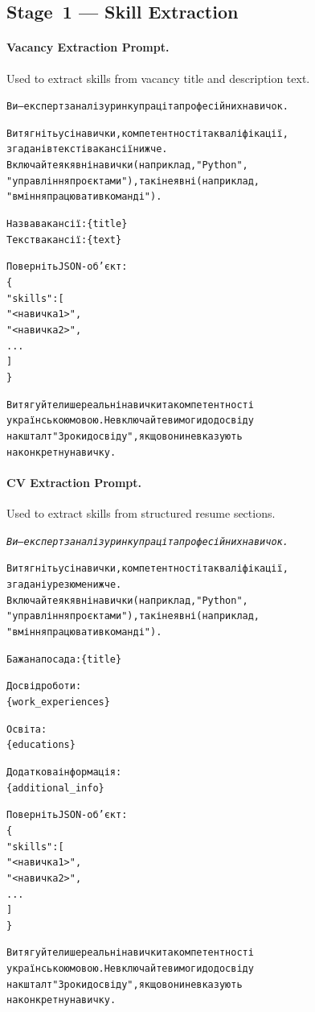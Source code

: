 \documentclass[11pt]{article}
\begin{document}
\subsection{Stage~1 --- Skill Extraction}

\paragraph{Vacancy Extraction Prompt.}
Used to extract skills from vacancy title and description text.

\begin{small}
\begin{alltt}\selectfont
Ви — експерт з аналізу ринку праці та професійних навичок.

Витягніть усі навички, компетентності та кваліфікації,
згадані в тексті вакансії нижче.
Включайте як явні навички (наприклад, "Python",
"управління проєктами"), так і неявні (наприклад,
"вміння працювати в команді").

Назва вакансії: \{title\}
Текст вакансії: \{text\}

Поверніть JSON-об'єкт:
\{
  "skills": [
    "<навичка 1>",
    "<навичка 2>",
    ...
  ]
\}

Витягуйте лише реальні навички та компетентності
українською мовою. Не включайте вимоги до досвіду
на кшталт "3 роки досвіду", якщо вони не вказують
на конкретну навичку.
\end{alltt}
\end{small}

\paragraph{CV Extraction Prompt.}
Used to extract skills from structured resume sections.

\begin{small}
\begin{alltt}\selectfont\itshape
Ви — експерт з аналізу ринку праці та професійних навичок.

Витягніть усі навички, компетентності та кваліфікації,
згадані у резюме нижче.
Включайте як явні навички (наприклад, "Python",
"управління проєктами"), так і неявні (наприклад,
"вміння працювати в команді").

Бажана посада: \{title\}

Досвід роботи:
\{work\_experiences\}

Освіта:
\{educations\}

Додаткова інформація:
\{additional\_info\}

Поверніть JSON-об'єкт:
\{
  "skills": [
    "<навичка 1>",
    "<навичка 2>",
    ...
  ]
\}

Витягуйте лише реальні навички та компетентності
українською мовою. Не включайте вимоги до досвіду
на кшталт "3 роки досвіду", якщо вони не вказують
на конкретну навичку.
\end{alltt}
\end{small}
\end{document}
